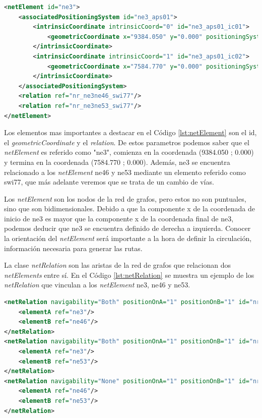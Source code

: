     \begin{lstlisting}[language = XML, caption = Clase \textit{netElement} , label = {lst:netElement}]
<netElement id="ne3">
    <associatedPositioningSystem id="ne3_aps01">
        <intrinsicCoordinate intrinsicCoord="0" id="ne3_aps01_ic01">
            <geometricCoordinate x="9384.050" y="0.000" positioningSystemRef="gps01"/>
        </intrinsicCoordinate>
        <intrinsicCoordinate intrinsicCoord="1" id="ne3_aps01_ic02">
            <geometricCoordinate x="7584.770" y="0.000" positioningSystemRef="gps01"/>
        </intrinsicCoordinate>
    </associatedPositioningSystem>
    <relation ref="nr_ne3ne46_swi77"/>
    <relation ref="nr_ne3ne53_swi77"/>
</netElement>
    \end{lstlisting}
    
    Los elementos mas importantes a destacar en el Código \ref{lst:netElement} son el id, el \textit{geometricCoordinate} y el \textit{relation}. De estos parametros podemos saber que el \textit{netElement} es referido como "ne3", comienza en la coordenada (9384.050 ; 0.000) y termina en la coordenada (7584.770 ; 0.000). Además, ne3 se encuentra relacionado a los \textit{netElement} ne46 y ne53 mediante un elemento referido como swi77, que más adelante veremos que se trata de un cambio de vías.

    Los \textit{netElement} son los nodos de la red de grafos, pero estos no son puntuales, sino que son bidimensionales. Debido a que la componente x de la coordenada de inicio de ne3 es mayor que la componente x de la coordenada final de ne3, podemos deducir que ne3 se encuentra definido de derecha a izquierda. Conocer la orientación del \textit{netElement} será importante a la hora de definir la circulación, información necesaria para generar las rutas.

    La clase \textit{netRelation} son las aristas de la red de grafos que relacionan dos \textit{netElements} entre sí. En el Código \ref{lst:netRelation} se muestra un ejemplo de los \textit{netRelation} que vinculan a los \textit{netElement} ne3, ne46 y ne53.    
    
    \begin{lstlisting}[language = XML, caption = Clase \textit{netRelation} , label = {lst:netRelation}]
<netRelation navigability="Both" positionOnA="1" positionOnB="1" id="nr_ne3ne46_swi77">
    <elementA ref="ne3"/>
    <elementB ref="ne46"/>
</netRelation>
<netRelation navigability="Both" positionOnA="1" positionOnB="1" id="nr_ne3ne53_swi77">
    <elementA ref="ne3"/>
    <elementB ref="ne53"/>
</netRelation>
<netRelation navigability="None" positionOnA="1" positionOnB="1" id="nr_ne46ne53_swi77">
    <elementA ref="ne46"/>
    <elementB ref="ne53"/>
</netRelation>
    \end{lstlisting}
    
